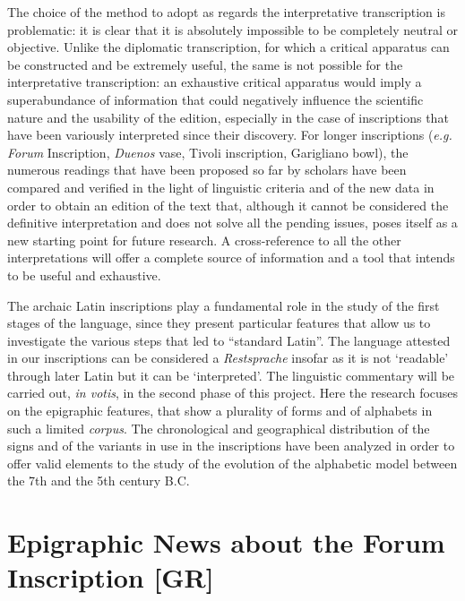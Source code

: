 \documentclass[amsthm,ebook]{saparticle}
\begin{document}
The choice of the method to adopt as regards the interpretative transcription is problematic: it is clear that it is
absolutely impossible to be completely neutral or objective. Unlike the diplomatic transcription, for which a critical
apparatus can be constructed and be extremely useful, the same is not possible for the interpretative transcription: an
exhaustive critical apparatus would imply a superabundance of information that could negatively influence the
scientific nature and the usability of the edition, especially in the case of inscriptions that have been variously
interpreted since their discovery. For longer inscriptions (\emph{e.g.} \emph{Forum} Inscription, \emph{Duenos} vase, Tivoli inscription,
Garigliano bowl), the numerous readings that have been proposed so far by scholars have been compared and verified in
the light of linguistic criteria and of the new data in order to obtain an edition of the text that, although it cannot
be considered the definitive interpretation and does not solve all the pending issues, poses itself as a new starting
point for future research. A cross-reference to all the other interpretations will offer a complete source of
information and a tool that intends to be useful and exhaustive.

The archaic Latin inscriptions play a fundamental role in the study of the first stages of the language, since they
present particular features that allow us to investigate the various steps that led to ``standard Latin''. The language
attested in our inscriptions can be considered a \emph{Restsprache} insofar as it is not `readable' through later Latin
but it can be `interpreted'. The linguistic commentary will be carried out, \emph{in votis}, in the second phase of this
project. Here the research focuses on the epigraphic features, that show a plurality of forms and of alphabets in such
a limited \emph{corpus}. The chronological and geographical distribution of the signs and of the variants in use in the
inscriptions have been analyzed in order to offer valid elements to the study of the evolution of the alphabetic model
between the 7th and the 5th century B.C.

\section{Epigraphic News about the Forum Inscription [GR]}\label{sec:news}
\end{document}
